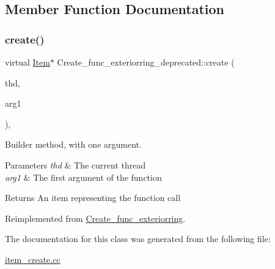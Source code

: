 \subsection{Member Function Documentation}
\mbox{\label{classCreate__func__exteriorring__deprecated_afec0600433348b5b76dec6b08d320a46}} 
\subsubsection{\texorpdfstring{create()}{create()}}
{\footnotesize\ttfamily virtual \mbox{\hyperlink{classItem}{Item}}$\ast$ Create\+\_\+func\+\_\+exteriorring\+\_\+deprecated\+::create (\begin{DoxyParamCaption}\item[{T\+HD $\ast$}]{thd,  }\item[{\mbox{\hyperlink{classItem}{Item}} $\ast$}]{arg1 }\end{DoxyParamCaption})\hspace{0.3cm}{\ttfamily [inline]}, {\ttfamily [virtual]}}

Builder method, with one argument. 
\begin{DoxyParams}{Parameters}
{\em thd} & The current thread \\
\hline
{\em arg1} & The first argument of the function \\
\hline
\end{DoxyParams}
\begin{DoxyReturn}{Returns}
An item representing the function call 
\end{DoxyReturn}


Reimplemented from \mbox{\hyperlink{classCreate__func__exteriorring_a5c826151baad6fc0e554c5faacbc552a}{Create\+\_\+func\+\_\+exteriorring}}.



The documentation for this class was generated from the following file\+:\begin{DoxyCompactItemize}
\item 
\mbox{\hyperlink{item__create_8cc}{item\+\_\+create.\+cc}}\end{DoxyCompactItemize}
